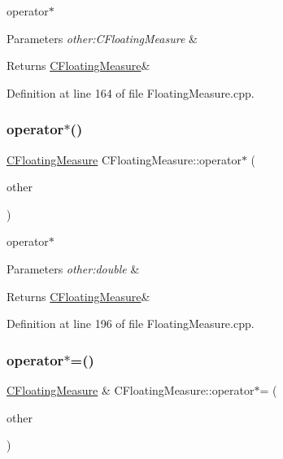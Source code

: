 operator$\ast$ 


\begin{DoxyParams}{Parameters}
{\em other\+:\+C\+Floating\+Measure} & \\
\hline
\end{DoxyParams}
\begin{DoxyReturn}{Returns}
\hyperlink{classCFloatingMeasure}{C\+Floating\+Measure}\& 
\end{DoxyReturn}


Definition at line 164 of file Floating\+Measure.\+cpp.

\mbox{\label{classCFloatingMeasure_a31cedd2120675c56064e12556432f550}} 
\subsubsection{\texorpdfstring{operator$\ast$()}{operator*()}\hspace{0.1cm}{\footnotesize\ttfamily [2/2]}}
{\footnotesize\ttfamily \hyperlink{classCFloatingMeasure}{C\+Floating\+Measure} C\+Floating\+Measure\+::operator$\ast$ (\begin{DoxyParamCaption}\item[{const double \&}]{other }\end{DoxyParamCaption})}



operator$\ast$ 


\begin{DoxyParams}{Parameters}
{\em other\+:double} & \\
\hline
\end{DoxyParams}
\begin{DoxyReturn}{Returns}
\hyperlink{classCFloatingMeasure}{C\+Floating\+Measure}\& 
\end{DoxyReturn}


Definition at line 196 of file Floating\+Measure.\+cpp.

\mbox{\label{classCFloatingMeasure_a2df7738d5c017a02c1f11c40809cac96}} 
\subsubsection{\texorpdfstring{operator$\ast$=()}{operator*=()}\hspace{0.1cm}{\footnotesize\ttfamily [1/3]}}
{\footnotesize\ttfamily \hyperlink{classCFloatingMeasure}{C\+Floating\+Measure} \& C\+Floating\+Measure\+::operator$\ast$= (\begin{DoxyParamCaption}\item[{const \hyperlink{classCFloatingMeasure}{C\+Floating\+Measure} \&}]{other }\end{DoxyParamCaption})}



